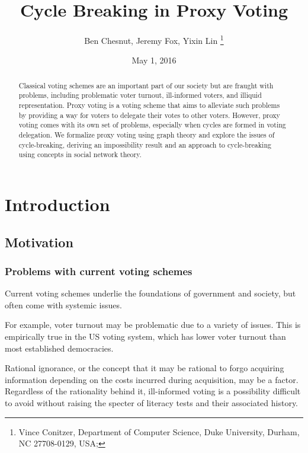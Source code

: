 \documentclass[10pt]{article}
\theoremstyle{definition}
\begin{document}
  
\title{Cycle Breaking in Proxy Voting
}
\date{May 1, 2016}

\author{
Ben Chesnut, Jeremy Fox, Yixin Lin \thanks{%
Vince Conitzer, Department of Computer Science, Duke University, Durham, NC
27708-0129, USA;}}

\maketitle

\section{Introduction}

\begin{abstract}

Classical voting schemes are an important part of our society but are fraught with problems, including problematic voter turnout, ill-informed voters, and illiquid representation. Proxy voting is a voting scheme that aims to alleviate such problems by providing a way for voters to delegate their votes to other voters. However, proxy voting comes with its own set of problems, especially when cycles are formed in voting delegation. We formalize proxy voting using graph theory and explore the issues of cycle-breaking, deriving an impossibility result and an approach to cycle-breaking using concepts in social network theory.

\end{abstract}

\subsection{Motivation}

\subsubsection{Problems with current voting schemes}

Current voting schemes underlie the foundations of government and society, but often come with systemic issues. 

For example, voter turnout may be problematic due to a variety of issues. This is empirically true in the US voting system\cite{turnout}, which has lower voter turnout than most established democracies. 

Rational ignorance\cite{rationalIgnorance}, or the concept that it may be rational to forgo acquiring information depending on the costs incurred during acquisition, may be a factor. Regardless of the rationality behind it, ill-informed voting is a possibility difficult to avoid without raising the specter of literacy tests and their associated history.
\end{document}
